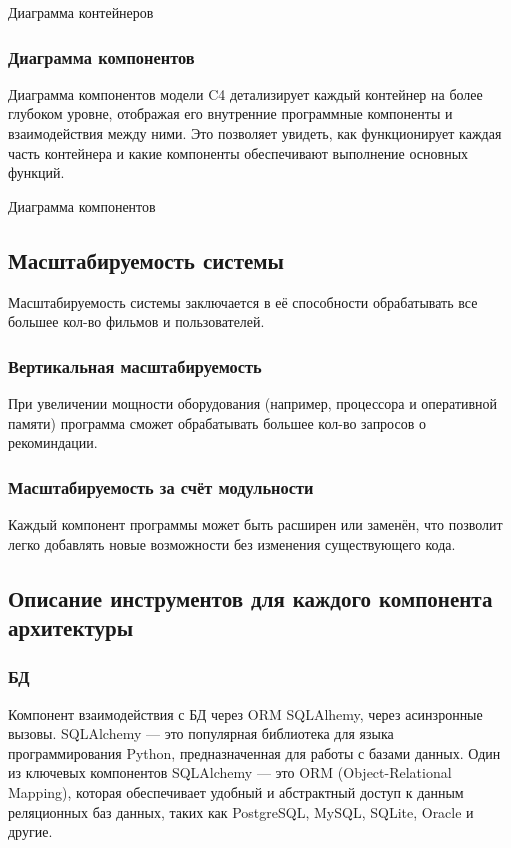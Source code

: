 \begin{image}
	\caption{Диаграмма контейнеров}
	\label{fig:c4:container2}
\end{image}


\subsubsection{Диаграмма компонентов}

Диаграмма компонентов модели C4 детализирует
каждый контейнер на более глубоком уровне,
отображая его внутренние программные компоненты и взаимодействия между ними.
Это позволяет увидеть, как функционирует каждая часть контейнера
и какие компоненты обеспечивают выполнение основных функций.

\begin{image}
	\caption{Диаграмма компонентов}
	\label{fig:c4:components3}
\end{image}

\subsection{Масштабируемость системы}

Масштабируемость системы заключается в её способности обрабатывать все большее кол-во фильмов и пользователей.

\subsubsection{Вертикальная масштабируемость}

При увеличении мощности оборудования
(например, процессора и оперативной памяти)
программа сможет обрабатывать большее кол-во запросов о рекоминдации.

\subsubsection{Масштабируемость за счёт модульности}

Каждый компонент программы
может быть расширен или заменён,
что позволит легко добавлять новые возможности
без изменения существующего кода.

\subsection{Описание инструментов для каждого компонента архитектуры}


\subsubsection{БД}
Компонент взаимодействия с БД через ORM SQLAlhemy, через асинзронные вызовы.
SQLAlchemy — это популярная библиотека для языка программирования Python, предназначенная для работы с базами данных.
Один из ключевых компонентов SQLAlchemy — это ORM (Object-Relational Mapping), которая обеспечивает удобный и абстрактный доступ к данным реляционных баз данных, таких как PostgreSQL, MySQL, SQLite, Oracle и другие.
